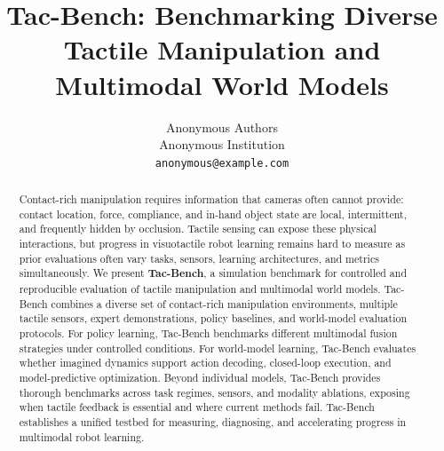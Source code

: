 \documentclass{article}
\title{Tac-Bench: Benchmarking Diverse Tactile Manipulation and Multimodal World Models}
\author{
  Anonymous Authors\\
  Anonymous Institution\\
  \texttt{anonymous@example.com} \\
}
\newcommand{\weihan}[1]{\textcolor{purple}{\textbf{weihan}: #1}}
\begin{document}
\maketitle


\begin{abstract}
    Contact-rich manipulation requires information that cameras often cannot provide: contact location, force, compliance, and in-hand object state are local, intermittent, and frequently hidden by occlusion. Tactile sensing can expose these physical interactions, but progress in visuotactile robot learning remains hard to measure as prior evaluations often vary tasks, sensors, learning architectures, and metrics simultaneously. We present \textbf{Tac-Bench}, a simulation benchmark for controlled and reproducible evaluation of tactile manipulation and multimodal world models. Tac-Bench combines a diverse set of contact-rich manipulation environments, multiple tactile sensors, expert demonstrations, policy baselines, and world-model evaluation protocols. For policy learning, Tac-Bench benchmarks different multimodal fusion strategies under controlled conditions. For world-model learning, Tac-Bench evaluates whether imagined dynamics support action decoding, closed-loop execution, and model-predictive optimization. Beyond individual models, Tac-Bench provides thorough benchmarks across task regimes, sensors, and modality ablations, exposing when tactile feedback is essential and where current methods fail. Tac-Bench establishes a unified testbed for measuring, diagnosing, and accelerating progress in multimodal robot learning.
\end{abstract}
\end{document}
